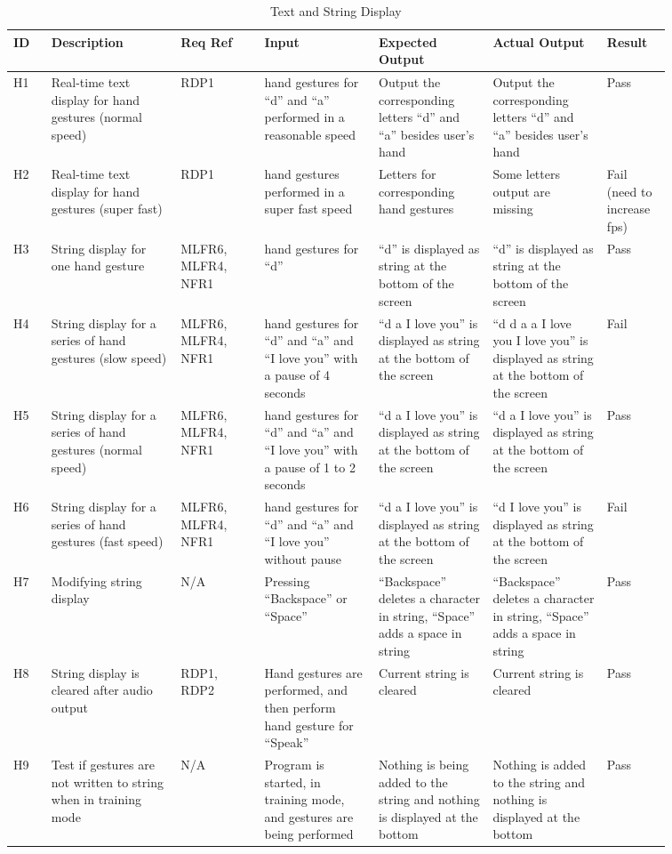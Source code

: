 \documentclass[12pt, titlepage]{article}
\begin{document}
\renewcommand{\arraystretch}{1.2}
\noindent \begin{longtable}{p{0.05\linewidth}|p{0.17\linewidth}|p{0.11\linewidth}|p{0.15\linewidth}|p{0.15\linewidth}|p{0.15\linewidth}|p{0.08\linewidth}}
\hline
\textbf{ID} & \textbf{Description} & \textbf{Req Ref} & \textbf{Input} & \textbf{Expected Output} & \textbf{Actual Output} & \textbf{Result}\\
\hline
H1 & Real-time text display for hand gestures (normal speed) & RDP1 & hand gestures for “d” and “a” performed in a reasonable speed & Output the corresponding letters “d” and “a” besides user’s hand & Output the corresponding letters “d” and “a” besides user’s hand & Pass\\ \hline
H2 & Real-time text display for hand gestures (super fast) & RDP1 & hand gestures performed in a super fast speed & Letters for corresponding hand gestures & Some letters output are missing & Fail (need to increase fps)\\ \hline
H3 & String display for one hand gesture & MLFR6, MLFR4, NFR1 & hand gestures for “d” & “d” is displayed as string at the bottom of the screen & “d” is displayed as string at the bottom of the screen & Pass\\ \hline
H4 & String display for a series of hand gestures (slow speed) & MLFR6, MLFR4, NFR1 & hand gestures for “d” and “a” and “I love you” with a pause of 4 seconds & “d a I love you” is displayed as string at the bottom of the screen & “d d a a I love you I love you” is displayed as string at the bottom of the screen & Fail\\ \hline
H5 & String display for a series of hand gestures (normal speed) & MLFR6, MLFR4, NFR1 & hand gestures for “d” and “a” and “I love you” with a pause of 1 to 2 seconds & “d a I love you” is displayed as string at the bottom of the screen & “d a I love you” is displayed as string at the bottom of the screen
& Pass\\ \hline
H6 & String display for a series of hand gestures (fast speed) & MLFR6, MLFR4, NFR1 & hand gestures for “d” and “a” and “I love you” without pause & “d a I love you” is displayed as string at the bottom of the screen & “d I love you” is displayed as string at the bottom of the screen & Fail\\ \hline
H7 & Modifying string display & N/A & Pressing “Backspace” or “Space” & “Backspace” deletes a character in string, “Space” adds a space in string & “Backspace” deletes a character in string, “Space” adds a space in string & Pass\\ \hline
H8 & String display is cleared after audio output & RDP1, RDP2 & Hand gestures are performed, and then perform hand gesture for “Speak” & Current string is cleared & Current string is cleared & Pass\\ \hline
H9 & Test if gestures are not written to string when in training mode & N/A & Program is started, in training mode, and gestures are being performed & Nothing is being added to the string and nothing is displayed at the bottom & Nothing is added to the string and nothing is displayed at the bottom & Pass
\hline
\caption{Text and String Display}
\end{longtable}
\end{document}
